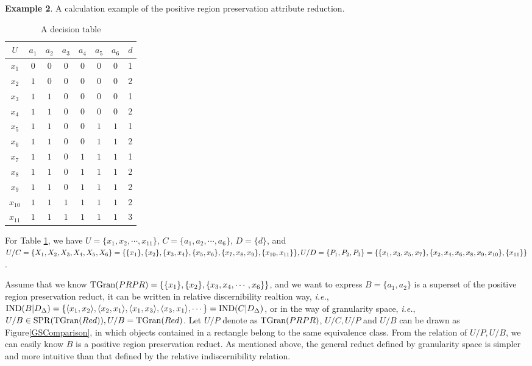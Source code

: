 \documentclass[review]{elsarticle}
\begin{document}
		\textbf{Example 2}.\label{calculationEx} A calculation example of the positive region preservation attribute reduction.
		\begin{table}[htbp]
			\caption{A decision table}
			\centering
				\begin{tabular}{cccccccc}
					\hline
					$U$ & $a_{1}$ & $a_{2}$ & $a_{3}$ & $a_{4}$ & $a_{5}$ & $a_{6}$ & $d$\\
					\hline
					$x_{1}$ & $0$ & $0$ & $0$ & $0$ & $0$ & $0$ & 1\\
					$x_{2}$ & $1$ & $0$ & $0$ & $0$ & $0$ & $0$ & 2\\
					$x_{3}$ & $1$ & $1$ & $0$ & $0$ & $0$ & $0$ & 1\\
					$x_{4}$ & $1$ & $1$ & $0$ & $0$ & $0$ & $0$ & 2\\
					$x_{5}$ & $1$ & $1$ & $0$ & $0$ & $1$ & $1$ & 1\\
					$x_{6}$ & $1$ & $1$ & $0$ & $0$ & $1$ & $1$ & 2\\
					$x_{7}$ & $1$ & $1$ & $0$ & $1$ & $1$ & $1$ & 1\\
					$x_{8}$ & $1$ & $1$ & $0$ & $1$ & $1$ & $1$ & 2\\
					$x_{9}$ & $1$ & $1$ & $0$ & $1$ & $1$ & $1$ & 2\\
					$x_{10}$ & $1$ & $1$ & $1$ & $1$ & $1$ & $1$ & 2\\
					$x_{11}$ & $1$ & $1$ & $1$ & $1$ & $1$ & $1$ & 3\\
					\hline
				\end{tabular}
			\label{tab:1}
		\end{table}
		\par For Table \ref{tab:1}, we have $U=\lbrace x_{1},x_{2},\cdots,x_{11}\rbrace$, $C=\lbrace a_{1}, a_{2},\cdots,a_{6} \rbrace$, $D=\lbrace d \rbrace$, and $U/C=\lbrace X_{1},X_{2},X_{3},X_{4},X_{5},X_{6} \rbrace=\lbrace \lbrace x_{1} \rbrace,\lbrace x_{2} \rbrace,\lbrace x_{3},x_{4} \rbrace,\lbrace x_{5},x_{6} \rbrace,\lbrace x_{7},x_{8},\\x_{9} \rbrace,\lbrace x_{10},x_{11} \rbrace \rbrace,U/D=\lbrace P_{1},P_{2},P_{3} \rbrace=\lbrace \lbrace x_{1},x_{3},x_{5},x_{7} \rbrace,\lbrace x_{2},x_{4},x_{6},x_{8},x_{9},x_{10} \rbrace,\\\lbrace x_{11} \rbrace \rbrace$.
		\par Assume that we know ${\rm TGran}(PRPR)=\{\{x_1\},\{x_2\},\{x_3,x_4,\cdots,x_6\}\}$, and we want to express $B=\{a_1,a_2\}$ is a superset of the positive region preservation reduct, it can be written in relative discernibility realtion way, \emph{i.e.}, ${\rm IND}(B|D_\Delta)=\{\langle x_1,x_2\rangle ,\langle x_2,x_1\rangle ,\langle x_1,x_3\rangle ,\langle x_3,x_1\rangle ,\cdots\}={\rm IND}(C|D_\Delta)$, or in the way of granularity space, \emph{i.e.}, $U/B \in {\rm SPR}({\rm TGran}(Red)), U/B={\rm TGran}(Red)$. Let $U/P$ denote as ${\rm TGran}(PRPR)$,  $U/C,U/P$ and $U/B$ can be drawn as Figure\ref{GSComparison}, in which objects contained in a rectangle belong to the same equivalence class. From the relation of $U/P, U/B$, we can easily know $B$ is a positive region preservation reduct. As mentioned above, the general reduct defined by granularity space is simpler and more intuitive than that defined by the relative indiscernibility relation.
		
\end{document}
